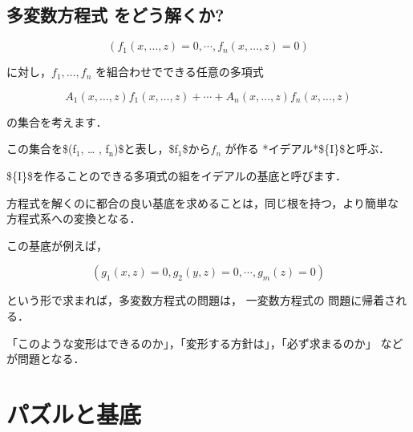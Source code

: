 \documentclass[a4j,12pt]{jarticle}
\begin{document}
\subsection{多変数方程式 をどう解くか?}
\label{sec:org89986f8}

$$(f_1(x, \ldots, z) =0, \cdots, f_n(x, \ldots, z) =0)$$

に対し，\(f_1, \ldots, f_n\) を組合わせでできる任意の多項式

$$A_1(x, \ldots, z) f_1(x, \ldots, z) + \cdots + A_n(x, \ldots, z)
f_n(x, \ldots, z)$$

の集合を考えます．

この集合を\$(f\(_{\text{1}}\), \ldots{} , f\(_{\text{n}}\))\$と表し，\$f\(_{\text{1}}\)\$から\(f_n\) が作る
*イデアル*\$\{\cal I\}\$と呼ぶ．

\$\{\cal I\}\$を作ることのできる多項式の組をイデアルの基底と呼びます．

方程式を解くのに都合の良い基底を求めることは，同じ根を持つ，より簡単な
方程式系への変換となる．

この基底が例えば，

$$(g_1(x, z) =0, g_2(y,z) = 0, \cdots, g_m(z) =0)$$

という形で求まれば，多変数方程式の問題は， 一変数方程式の
問題に帰着される．

「このような変形はできるのか」，「変形する方針は」，「必ず求まるのか」
などが問題となる．

\section{パズルと基底}
\label{sec:org071e231}
\end{document}
